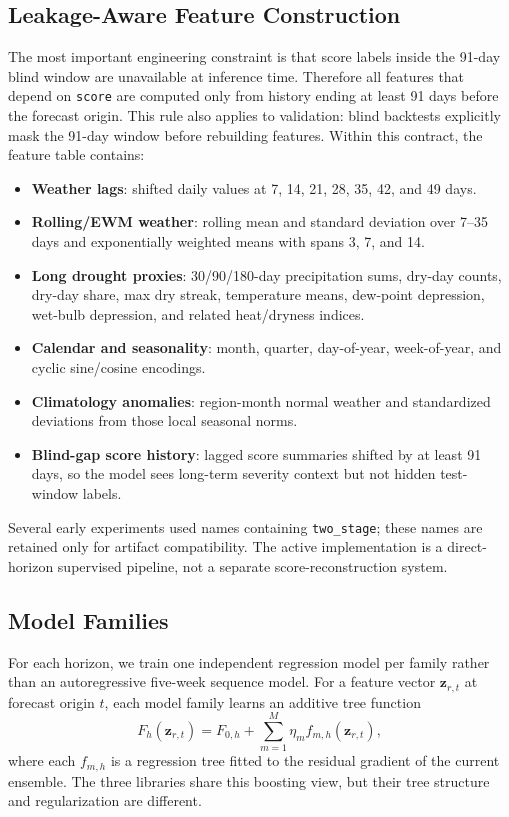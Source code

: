 \documentclass[conference]{IEEEtran}
\begin{document}
\subsection{Leakage-Aware Feature Construction}
The most important engineering constraint is that score labels inside the
91-day blind window are unavailable at inference time. Therefore all features
that depend on \texttt{score} are computed only from history ending at least
91 days before the forecast origin. This rule also applies to validation:
blind backtests explicitly mask the 91-day window before rebuilding features.
Within this contract, the feature table contains:

\begin{itemize}
  \item \textbf{Weather lags}: shifted daily values at 7, 14, 21, 28, 35, 42,
        and 49 days.
  \item \textbf{Rolling/EWM weather}: rolling mean and standard deviation over
        7--35 days and exponentially weighted means with spans 3, 7, and 14.
  \item \textbf{Long drought proxies}: 30/90/180-day precipitation sums,
        dry-day counts, dry-day share, max dry streak, temperature means,
        dew-point depression, wet-bulb depression, and related heat/dryness
        indices.
  \item \textbf{Calendar and seasonality}: month, quarter, day-of-year,
        week-of-year, and cyclic sine/cosine encodings.
  \item \textbf{Climatology anomalies}: region-month normal weather and
        standardized deviations from those local seasonal norms.
  \item \textbf{Blind-gap score history}: lagged score summaries shifted by at
        least 91 days, so the model sees long-term severity context but not
        hidden test-window labels.
\end{itemize}

Several early experiments used names containing \texttt{two\_stage}; these
names are retained only for artifact compatibility. The active implementation
is a direct-horizon supervised pipeline, not a separate score-reconstruction
system.

\subsection{Model Families}
For each horizon, we train one independent regression model per family rather
than an autoregressive five-week sequence model. For a feature vector
$\mathbf{z}_{r,t}$ at forecast origin $t$, each model family learns an additive
tree function
\begin{equation}
  F_h(\mathbf{z}_{r,t}) =
  F_{0,h}+\sum_{m=1}^{M}\eta_m f_{m,h}(\mathbf{z}_{r,t}),
\end{equation}
where each $f_{m,h}$ is a regression tree fitted to the residual gradient of
the current ensemble. The three libraries share this boosting view, but their
tree structure and regularization are different.
\end{document}
